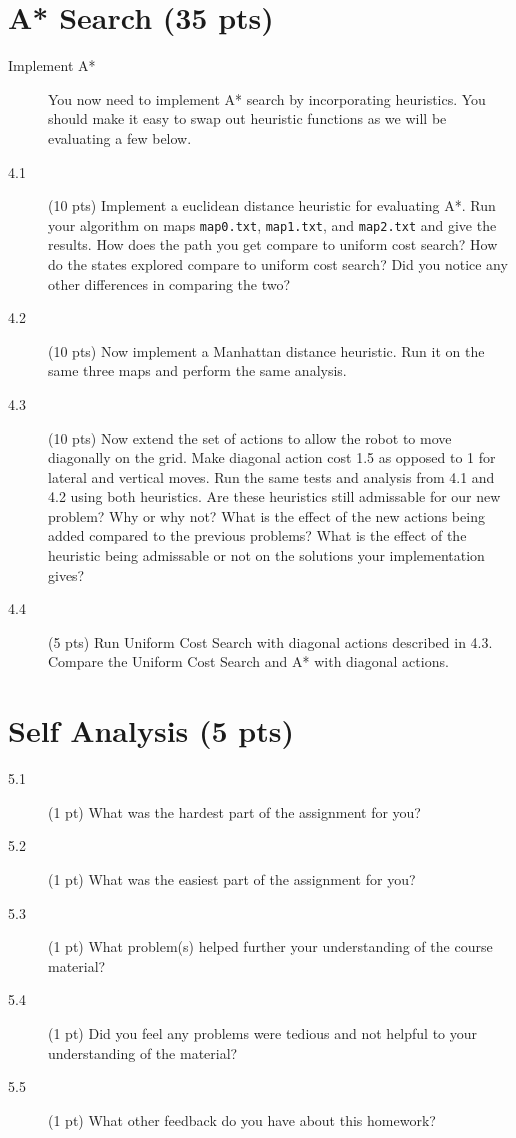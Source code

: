 \documentclass[11pt]{hermans-hw}
\begin{document}
\section{A* Search (35 pts)}
\begin{description}
\item[Implement A*] You now need to implement A* search by incorporating heuristics. You should make it easy to swap out heuristic functions as we will be evaluating a few below.

\item[4.1] (10 pts) Implement a euclidean distance heuristic for evaluating A*. Run your algorithm on maps \texttt{map0.txt}, \texttt{map1.txt}, and \texttt{map2.txt} and give the results. How does the path you get compare to uniform cost search? How do the states explored compare to uniform cost search? Did you notice any other differences in comparing the two?

\item[4.2] (10 pts) Now implement a Manhattan distance heuristic. Run it on the same three maps and perform the same analysis.

\item[4.3] (10 pts) Now extend the set of actions to allow the robot to move diagonally on the grid. Make diagonal action cost 1.5 as opposed to 1 for lateral and vertical moves. Run the same tests and analysis from 4.1 and 4.2 using both heuristics. Are these heuristics still admissable for our new problem? Why or why not? What is the effect of the new actions being added compared to the previous problems? What is the effect of the heuristic being admissable or not on the solutions your implementation gives? 

\item[4.4] (5 pts) Run Uniform Cost Search with diagonal actions described in 4.3. Compare the Uniform Cost Search and A* with diagonal actions. 


\end{description}

\section{Self Analysis (5 pts)}
\begin{description}
\item[5.1] (1 pt) What was the hardest part of the assignment for you?
\item[5.2] (1 pt) What was the easiest part of the assignment for you?
\item[5.3] (1 pt) What problem(s) helped further your understanding of the course material?
\item[5.4] (1 pt) Did you feel any problems were tedious and not helpful to your understanding of the material?
\item[5.5] (1 pt) What other feedback do you have about this homework?
\end{description}
\end{document}
